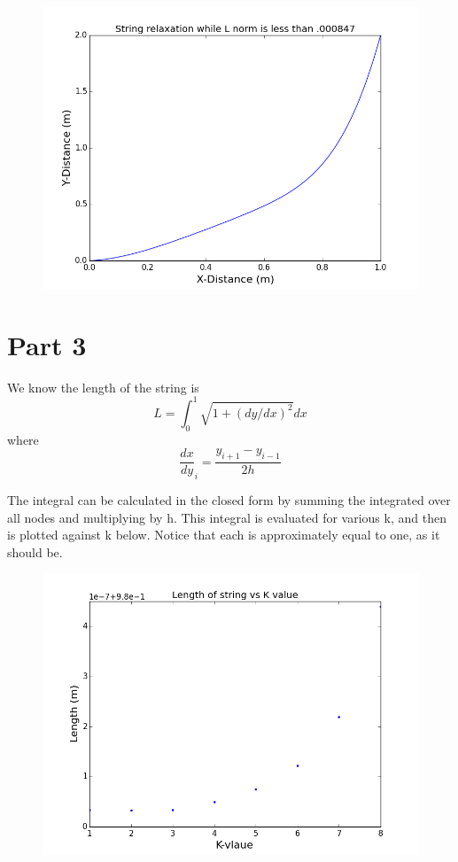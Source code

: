 \documentclass[11pt]{article}
\begin{document}
\begin{figure}[H]
\centering
\includegraphics[scale=.4]{2_relaxationWithL.png}
\end{figure}

\section{Part 3}
We know the length of the string is 
\begin{equation}
L = \int_{0}^{1} \sqrt{1+(dy/dx)^2}dx
\end{equation}
where 
\begin{equation}
\frac{dx}{dy}_i = \frac{y_{i+1}-y_{i-1}}{2h}
\end{equation}

The integral can be calculated in the closed form by summing the integrated over all nodes and multiplying by h. This integral is evaluated for various k, and then is plotted against k below. Notice that each is approximately equal to one, as it should be. 

\begin{figure}[H]
\centering
\includegraphics[scale=.4]{3_LvK.png}
\end{figure}
\end{document}
